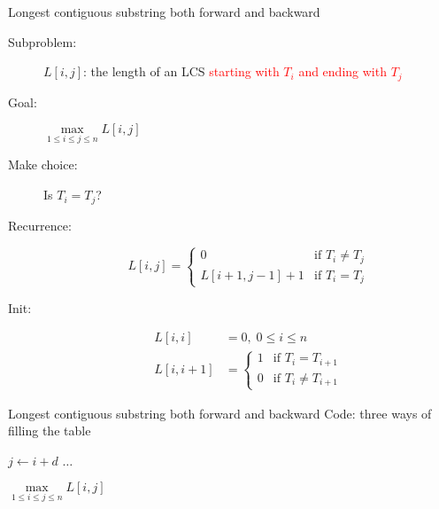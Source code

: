 \begin{frame}{Longest contiguous substring both forward and backward}
  \begin{description}
	\item[Subproblem:] $L[i,j]$: the length of an LCS \textcolor{red}{starting with $T_{i}$ and ending with $T_{j}$}
	\item[Goal:] $\max\limits_{1 \le i \le j \le n} L[i,j]$
	  \pause
	\item[Make choice:] Is $T_{i} = T_{j}$?
	\item[Recurrence:] 
	  \begin{displaymath}
		L[i,j] = \left\{ \begin{array}{ll}
		  0 & \textrm{if $T_{i} \neq T_{j}$}  \\
		  L[i+1,j-1] + 1 & \textrm{if $T_{i} = T_{j}$}
		\end{array} \right.
	  \end{displaymath}
	  \pause
	\item[Init:]
	  \begin{align*}
		L[i,i] &= 0, \; 0 \le i \le n  \\
		L[i,i+1] &= \left\{ \begin{array}{ll}
		  1 & \text{if } T_{i} = T_{i+1}  \\
		  0 & \text{if } T_{i} \neq T_{i+1}
		  \end{array} \right.
	  \end{align*}
  \end{description}
\end{frame}
\begin{frame}[fragile]{Longest contiguous substring both forward and backward}
  Code: three ways of filling the table

  \begin{algorithmic}
	    \State $j \gets i + d$
		\State $\dots$
	  \EndFor
    \EndFor

	\State \Return $\max\limits_{1 \le i \le j \le n} L[i,j]$
  \end{algorithmic}

\end{frame}
